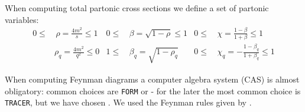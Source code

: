 When computing total partonic cross sections we define a set of partonic variables:
\begin{align}
0\leq&\,\rho = \frac {4m^2} s\leq 1 &0\leq&\,\beta = \sqrt{1-\rho}\leq 1 &0\leq&\,\chi = \frac{1-\beta}{1+\beta}\leq 1\\
&\rho_q = \frac {4m^2} {q^2}\leq 0 &1\leq&\,\beta_q = \sqrt{1-\rho_q} &0\leq&\,\chi_q = -\frac{1-\beta_q}{1+\beta_q}\leq 1
\end{align}

When computing Feynman diagrams a computer algebra system (CAS) is almost obligatory: common choices are \texttt{FORM}\cite{Vermaseren:2000nd} or \MMa\cite{Mathematica} - for the later the most common choice is \texttt{TRACER}\cite{Tracer}, but we have chosen \HEPMath\cite{wiebusch_hepmath_2015}. We used the Feynman rules given by \cite{Leader}.
